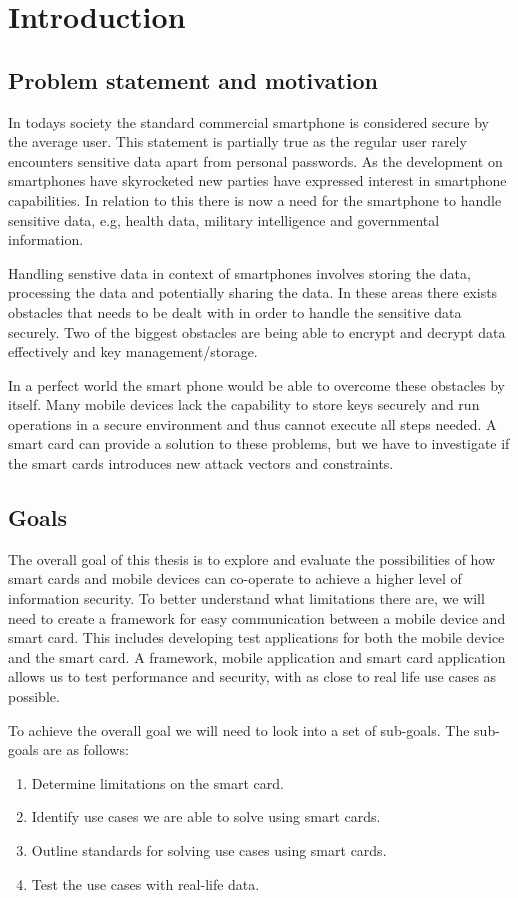 \chapter{Introduction}
\section{Problem statement and motivation}
In todays society the standard commercial smartphone is considered secure by the average user. This statement is partially true as the regular user rarely encounters sensitive data apart from personal passwords. As the development on smartphones have skyrocketed new parties have expressed interest in smartphone capabilities. In relation to this there is now a need for the smartphone to handle sensitive data, e.g, health data, military intelligence and governmental information.

Handling senstive data in context of smartphones involves storing the data, processing the data and potentially sharing the data. In these areas there exists obstacles that needs to be dealt with in order to handle the sensitive data securely. Two of the biggest obstacles are being able to encrypt and decrypt data effectively and key management/storage.

In a perfect world the smart phone would be able to overcome these obstacles by itself. Many mobile devices lack the capability to store keys securely and run operations in a secure environment and thus cannot execute all steps needed. A smart card can provide a solution to these problems, but we have to investigate if the smart cards introduces new attack vectors and constraints.

\section{Goals}
\label{sec:goals}
The overall goal of this thesis is to explore and evaluate the possibilities of how smart cards and mobile devices can co-operate to achieve a higher level of information security. To better understand what limitations there are, we will need to create a framework for easy communication between a mobile device and smart card. This includes developing test applications for both the mobile device and the smart card. A framework, mobile application and smart card application allows us to test performance and security, with as close to real life use cases as possible.

To achieve the overall goal we will need to look into a set of sub-goals. The sub-goals are as follows:
\begin{enumerate}
    \item Determine limitations on the smart card.
    \item Identify use cases we are able to solve using smart cards.
    \item Outline standards for solving use cases using smart cards.
    \item Test the use cases with real-life data.
\end{enumerate}

